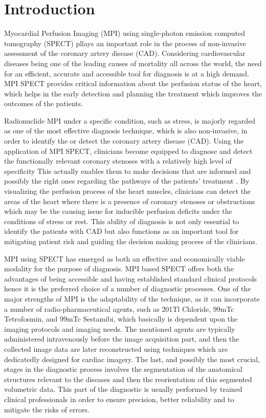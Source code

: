 \chapter{Introduction}
\label{ch:intro}

Myocardial Perfusion Imaging (MPI) using single-photon emission computed tomography (SPECT) pllays an important role in the process of non-invasive assessment of the coronary artery disease (CAD). Considering cardiovascular diseases being one of the leading causes of mortality all across the world, the need for an efficient, accurate and accessible tool for diagnosis is at a high demand. MPI SPECT provides critical information about the perfusion status of the heart, which helps in the early detection and planning the treatment which improves the outcomes of the patients.

Radionuclide MPI under a specific condition, such as stress, is majorly regarded as one of the most effective diagnosis technique, which is also non-invasive, in order to identify the or detect the coronary artery disease (CAD). Using the application of MPI SPECT, clinicians become equipped to diagnose and detect the functionally relevant coronary stenoses with a relatively high level of specificity This actually enables them to make decisions that are informed and possibly the right ones regarding the pathways of the patients' treatment \cite{10.1001/jamacardio.2017.2471}. By visualizing the perfusion process of the heart muscles, clinicians can detect the areas of the heart where there is a presence of coronary stenoses or obstructions which may be the causing issue for inducible perfusion deficits under the conditions of stress or rest. This ability of diagnosis is not only essential to identify the patients with CAD but also functions as an important tool for mitigating patient risk and guiding the decision making process of the clinicians.

MPI using SPECT has emerged as both an effective and economically viable modality for the purpose of diagnosis. MPI based SPECT offers both the advantages of being accessible and having established standard clinical protocols hence it is the preferred choice of a number of diagnostic processes. One of the major strengths of MPI is the adaptability of the technique, as it can incorporate a number of radio-pharmaceutical agents, such as 201Tl Chloride, 99mTc Tetrofosmin, and 99mTc Sestamibi, which basically is dependent upon the imaging protocols and imaging needs. The mentioned agents are typically administered intravenously before the image acquisition part, and then the collected image data are later reconstructed using techniques which are dedicatedly designed for cardiac imagery. The last, and possibly the most crucial, stages in the diagnostic process involves the segmentation of the anatomical structures relevant to the diseases and then the reorientation of this segmented volumetric data. This part of the diagnostic is usually performed by trained clinical professionals in order to ensure precision, better reliability and to mitigate the risks of errors.

